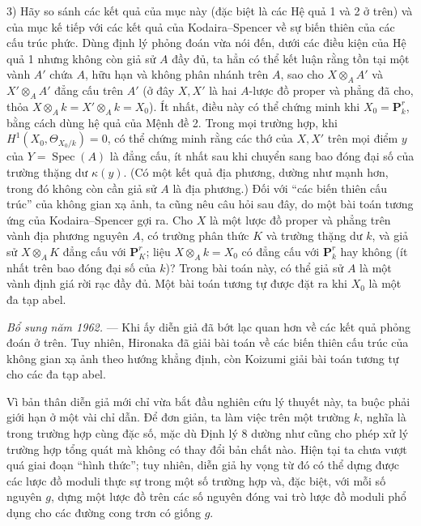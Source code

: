 3) Hãy so sánh các kết quả của mục này (đặc biệt là các Hệ quả 1 và 2 ở trên)
và của mục kế tiếp với các kết quả của Kodaira--Spencer về sự biến thiên của
các cấu trúc phức. Dùng định lý phỏng đoán vừa nói đến, dưới các điều kiện của
Hệ quả 1 nhưng không còn giả sử $A$ đầy đủ, ta hẳn có thể kết luận rằng tồn
tại một vành $A'$ chứa $A$, hữu hạn và không phân nhánh trên $A$, sao cho
$X\otimes_A A'$ và $X'\otimes_A A'$ đẳng cấu trên $A'$ (ở đây $X,X'$ là hai
$A$-lược đồ proper và phẳng đã cho, thỏa
$X\otimes_A k=X'\otimes_A k=X_0$). Ít nhất, điều này có thể chứng minh khi
$X_0=\mathbf P_k^r$, bằng cách dùng hệ quả của Mệnh đề 2. Trong mọi trường
hợp, khi $H^1(X_0,\Theta_{X_0/k})=0$, có thể chứng minh rằng các thớ của
$X,X'$ trên mọi điểm $y$ của $Y=\operatorname{Spec}(A)$ là đẳng cấu, ít nhất
sau khi chuyển sang bao đóng đại số của trường thặng dư $\kappa(y)$. (Có một
kết quả địa phương, dường như mạnh hơn, trong đó không còn cần giả sử $A$ là
địa phương.) Đối với “các biến thiên cấu trúc” của không gian xạ ảnh, ta cũng
nêu câu hỏi sau đây, do một bài toán tương ứng của Kodaira--Spencer gợi ra.
Cho $X$ là một lược đồ proper và phẳng trên vành địa phương nguyên $A$, có
trường phân thức $K$ và trường thặng dư $k$, và giả sử $X\otimes_A K$ đẳng
cấu với $\mathbf P_K^r$; liệu $X\otimes_A k=X_0$ có đẳng cấu với
$\mathbf P_k^r$ hay không (ít nhất trên bao đóng đại số của $k$)? Trong bài
toán này, có thể giả sử $A$ là một vành định giá rời rạc đầy đủ. Một bài toán
tương tự được đặt ra khi $X_0$ là một đa tạp abel.

\emph{Bổ sung năm 1962.} --- Khi ấy diễn giả đã bớt lạc quan hơn về các kết
quả phỏng đoán ở trên. Tuy nhiên, Hironaka đã giải bài toán về các biến thiên
cấu trúc của không gian xạ ảnh theo hướng khẳng định, còn Koizumi giải bài
toán tương tự cho các đa tạp abel.


Vì bản thân diễn giả mới chỉ vừa bắt đầu nghiên cứu lý thuyết này, ta buộc
phải giới hạn ở một vài chỉ dẫn. Để đơn giản, ta làm việc trên một trường $k$,
nghĩa là trong trường hợp cùng đặc số, mặc dù Định lý 8 dường như cũng cho phép
xử lý trường hợp tổng quát mà không có thay đổi bản chất nào. Hiện tại ta chưa
vượt quá giai đoạn “hình thức”; tuy nhiên, diễn giả hy vọng từ đó có thể dựng
được các lược đồ moduli thực sự trong một số trường hợp và, đặc biệt, với mỗi
số nguyên $g$, dựng một lược đồ trên các số nguyên đóng vai trò lược đồ moduli
phổ dụng cho các đường cong trơn có giống $g$.

